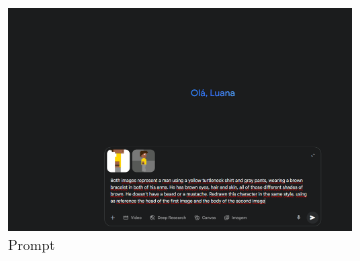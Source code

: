 \begin{figure}[htbp]
    \centering
    \caption{\small Processo da geração 17 do sprite em side view no Gemini Pro em julho/2025}
    \label{fig:geminiPro17}

    \begin{subfigure}{1\linewidth}
        \includegraphics[width=1\linewidth]{figs/geminiPro/chat6/tela1.PNG}
        \caption{\small Prompt}
        \label{fig:geminiPro17Prompt}
    \end{subfigure}
    \begin{subfigure}{0.3\linewidth}

\end{subfigure}
\end{figure}
